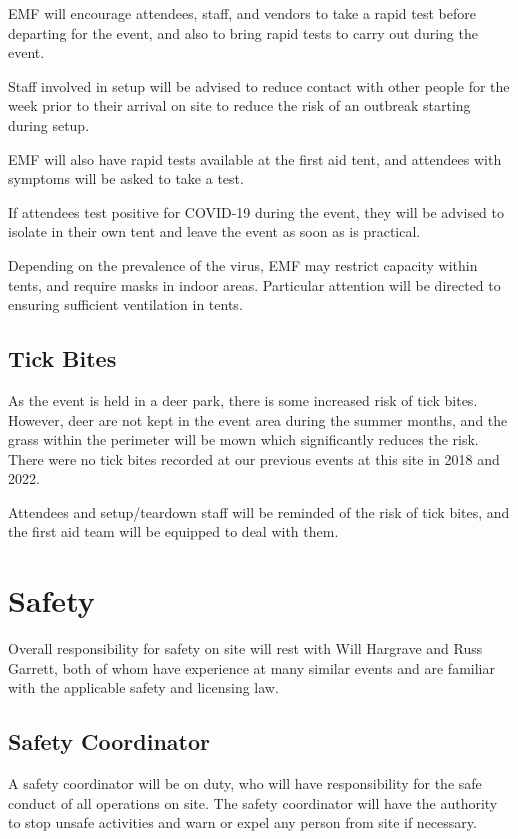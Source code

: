 EMF will encourage attendees, staff, and vendors to take a rapid test before
departing for the event, and also to bring rapid tests to carry out during the event.

Staff involved in setup will be advised to reduce contact with other people for the week prior to
their arrival on site to reduce the risk of an outbreak starting during setup.

EMF will also have rapid tests available at the first aid tent, and attendees with symptoms
will be asked to take a test.

If attendees test positive for COVID-19 during the event, they will be advised to isolate in
their own tent and leave the event as soon as is practical.

Depending on the prevalence of the virus, EMF may restrict capacity within tents, and
require masks in indoor areas. Particular attention will be directed to ensuring sufficient
ventilation in tents.

\subsection{Tick Bites}

As the event is held in a deer park, there is some increased risk of tick bites. However, deer
are not kept in the event area during the summer months, and the grass within the perimeter
will be mown which significantly reduces the risk. There were no tick bites recorded at our
previous events at this site in 2018 and 2022.

Attendees and setup/teardown staff will be reminded of the risk of tick bites, and the first aid team
will be equipped to deal with them.

\newpage

\section{Safety}\label{safety}

Overall responsibility for safety on site will rest with Will Hargrave and
Russ Garrett, both of whom have experience at many similar events and are
familiar with the applicable safety and licensing law.

\subsection{Safety Coordinator}

A safety coordinator will be on duty, who will have responsibility for the
safe conduct of all operations on site. The safety coordinator will have the
authority to stop unsafe activities and warn or expel any person from site if
necessary.

